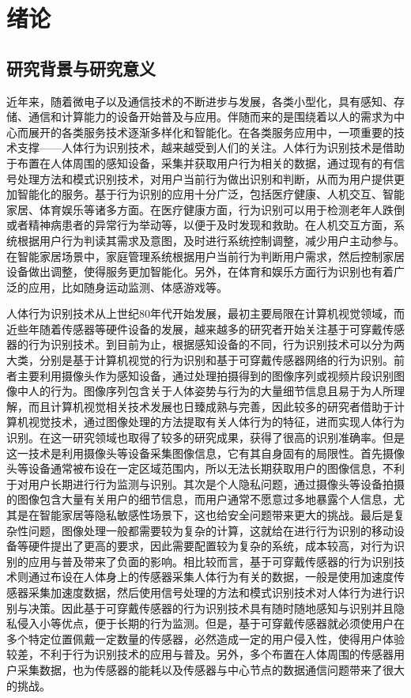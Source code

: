 
\chapter{绪论}
\section{研究背景与研究意义}
\par 近年来，随着微电子以及通信技术的不断进步与发展，各类小型化，具有感知、存储、通信和计算能力的设备开始普及与应用。伴随而来的是围绕着以人的需求为中心而展开的各类服务技术逐渐多样化和智能化。在各类服务应用中，一项重要的技术支撑——人体行为识别技术，越来越受到人们的关注。人体行为识别技术是借助于布置在人体周围的感知设备，采集并获取用户行为相关的数据，通过现有的有信号处理方法和模式识别技术，对用户当前行为做出识别和判断，从而为用户提供更加智能化的服务。基于行为识别的应用十分广泛，包括医疗健康、人机交互、智能家居、体育娱乐等诸多方面。在医疗健康方面，行为识别可以用于检测老年人跌倒或者精神病患者的异常行为举动等，以便于及时发现和救助。在人机交互方面，系统根据用户行为判读其需求及意图，及时进行系统控制调整，减少用户主动参与。在智能家居场景中，家庭管理系统根据用户当前行为判断用户需求，然后控制家居设备做出调整，使得服务更加智能化。另外，在体育和娱乐方面行为识别也有着广泛的应用，比如随身运动监测、体感游戏等。

\par 人体行为识别技术从上世纪80年代开始发展\cite{surveyOnSensors}，最初主要局限在计算机视觉领域，而近些年随着传感器等硬件设备的发展，越来越多的研究者开始关注基于可穿戴传感器的行为识别技术。到目前为止，根据感知设备的不同，行为识别技术可以分为两大类，分别是基于计算机视觉的行为识别和基于可穿戴传感器网络的行为识别。前者主要利用摄像头作为感知设备，通过处理拍摄得到的图像序列或视频片段识别图像中人的行为\cite{surveyOnVision}。图像序列包含关于人体姿势与行为的大量细节信息且易于为人所理解，而且计算机视觉相关技术发展也日臻成熟与完善，因此较多的研究者借助于计算机视觉技术，通过图像处理的方法提取有关人体行为的特征，进而实现人体行为识别。在这一研究领域也取得了较多的研究成果，获得了很高的识别准确率。但是这一技术是利用摄像头等设备采集图像信息，它有其自身固有的局限性。首先摄像头等设备通常被布设在一定区域范围内，所以无法长期获取用户的图像信息，不利于对用户长期进行行为监测与识别。其次是个人隐私问题，通过摄像头等设备拍摄的图像包含大量有关用户的细节信息，而用户通常不愿意过多地暴露个人信息，尤其是在智能家居等隐私敏感性场景下，这也给安全问题带来更大的挑战。最后是复杂性问题，图像处理一般都需要较为复杂的计算，这就给在进行行为识别的移动设备等硬件提出了更高的要求，因此需要配置较为复杂的系统，成本较高，对行为识别的应用与普及带来了负面的影响。相比较而言，基于可穿戴传感器的行为识别技术\cite{sensorBased}则通过布设在人体身上的传感器采集人体行为有关的数据，一般是使用加速度传感器采集加速度数据，然后使用信号处理的方法和模式识别技术对人体行为进行识别与决策。因此基于可穿戴传感器的行为识别技术具有随时随地感知与识别并且隐私侵入小等优点，便于长期的行为监测。但是，基于可穿戴传感器就必须使用户在多个特定位置佩戴一定数量的传感器，必然造成一定的用户侵入性，使得用户体验较差，不利于行为识别技术的应用与普及。另外，多个布置在人体周围的传感器用户采集数据，也为传感器的能耗以及传感器与中心节点的数据通信问题带来了很大的挑战。

